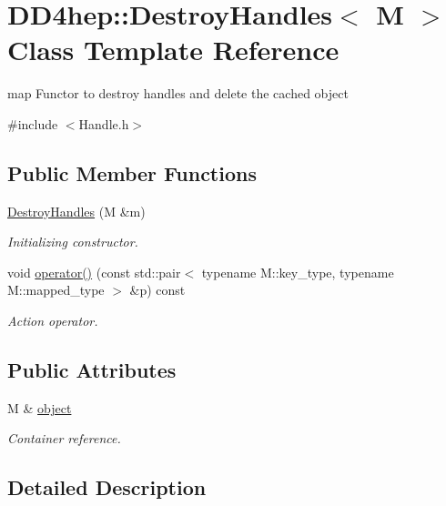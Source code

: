 \hypertarget{class_d_d4hep_1_1_destroy_handles}{
\section{DD4hep::DestroyHandles$<$ M $>$ Class Template Reference}
\label{class_d_d4hep_1_1_destroy_handles}
}


map Functor to destroy handles and delete the cached object  


{\ttfamily \#include $<$Handle.h$>$}\subsection*{Public Member Functions}
\begin{DoxyCompactItemize}
\item 
\hyperlink{class_d_d4hep_1_1_destroy_handles_a6ea33093d41f7687b16b6cdff8d265f3}{DestroyHandles} (M \&m)
\begin{DoxyCompactList}\small\item\em Initializing constructor. \item\end{DoxyCompactList}\item 
void \hyperlink{class_d_d4hep_1_1_destroy_handles_adeb0ed44285c0259a3124aac8ee67cdf}{operator()} (const std::pair$<$ typename M::key\_\-type, typename M::mapped\_\-type $>$ \&p) const 
\begin{DoxyCompactList}\small\item\em Action operator. \item\end{DoxyCompactList}\end{DoxyCompactItemize}
\subsection*{Public Attributes}
\begin{DoxyCompactItemize}
\item 
M \& \hyperlink{class_d_d4hep_1_1_destroy_handles_a4398c11430a5bb66b962d45133e2d5f1}{object}
\begin{DoxyCompactList}\small\item\em Container reference. \item\end{DoxyCompactList}\end{DoxyCompactItemize}


\subsection{Detailed Description}
